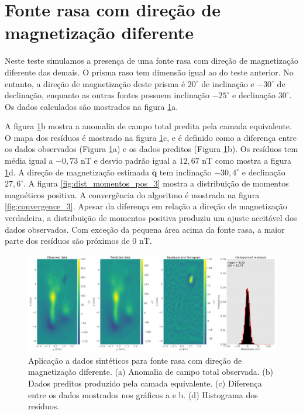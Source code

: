 \section{Fonte rasa com direção de magnetização diferente}
\label{sec:difdir_shallow}

Neste teste simulamos a presença de uma fonte rasa com direção de magnetização diferente das demais. O prisma raso tem dimensão igual ao do teste anterior. No entanto, a direção de magnetização deste prisma é $20^\circ$ de inclinação e $-30^\circ$ de declinação, enquanto as outras fontes possuem inclinação $-25^\circ$ e declinação $30^\circ$. Os dados calculados são mostrados na figura \ref{fig:data_fitting_3}a. 

A figura \ref{fig:data_fitting_3}b mostra a anomalia de campo total predita pela camada equivalente. O mapa dos resíduos é mostrado na figura \ref{fig:data_fitting_3}c, e é definido como a diferença entre os dados observados (Figura \ref{fig:data_fitting_3}a) e os dados preditos (Figura \ref{fig:data_fitting_3}b). Os resíduos tem média igual a $-0,73$ nT e desvio padrão igual a  $12,67$ nT como mostra a figura \ref{fig:data_fitting_3}d. A direção de magnetização estimada $\bar{\mathbf{q}}$ tem inclinação $-30,4^\circ$ e declinação $27,6^\circ$. A figura \ref{fig:dist_momentos_pos_3} mostra a distribuição de momentos magnéticos positiva. A convergência do algoritmo é mostrada na figura \ref{fig:convergence_3}. Apesar da diferença em relação a direção de magnetização verdadeira, a distribuição de momentos positiva produziu um ajuste aceitável dos dados observados. Com exceção da pequena área acima da fonte rasa, a maior parte dos resíduos são próximos de $0$ nT. 

\begin{figure}
	\centering
	\includegraphics[width=1.1\textwidth]{Fig/eqlayer/unidir_shallow_diff_test/data_fitting_LM_NNLS_magRM.png}
	\caption{Aplicação a dados sintéticos para fonte rasa com direção de magnetização diferente. (a) Anomalia de campo total observada. (b) Dados preditos produzido pela camada equivalente. (c) Diferença entre os dados mostrados nos gráficos a e b. (d) Histograma dos resíduos.}
	\label{fig:data_fitting_3}
\end{figure}


